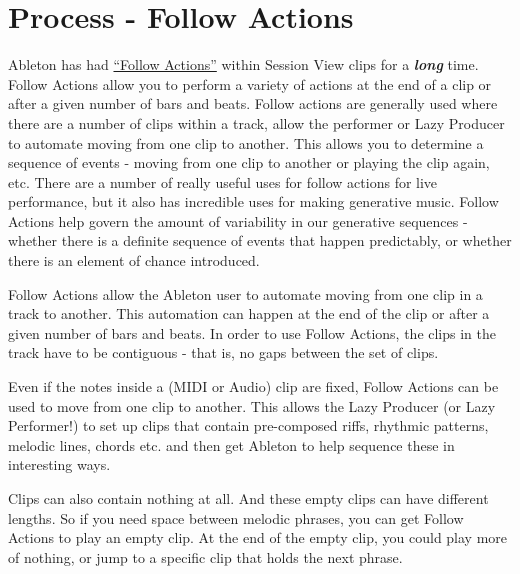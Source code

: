 \documentclass[
  12pt,
  letterpaper,
  oneside,
  open=any]{scrbook}
\begin{document}

\chapter{Process - Follow
Actions}\label{Chapter-003-Process-Follow_Actions}

Ableton has had
\href{https://www.ableton.com/en/live-manual/11/launching-clips/\#follow-actions}{``Follow
Actions''} within Session View clips for a \textbf{\emph{long}} time.
Follow Actions allow you to perform a variety of actions at the end of a
clip or after a given number of bars and beats. Follow actions are
generally used where there are a number of clips within a track, allow
the performer or Lazy Producer to automate moving from one clip to
another. This allows you to determine a sequence of events - moving from
one clip to another or playing the clip again, etc. There are a number
of really useful uses for follow actions for live performance, but it
also has incredible uses for making generative music. Follow Actions
help govern the amount of variability in our generative sequences -
whether there is a definite sequence of events that happen predictably,
or whether there is an element of chance introduced.

\begin{tcolorbox}[enhanced jigsaw, opacitybacktitle=0.6, rightrule=.15mm, leftrule=.75mm, opacityback=0, toptitle=1mm, toprule=.15mm, breakable, titlerule=0mm, colback=white, bottomtitle=1mm, title=\textcolor{quarto-callout-tip-color}{\faLightbulb}\hspace{0.5em}{Key idea}, coltitle=black, left=2mm, colframe=quarto-callout-tip-color-frame, bottomrule=.15mm, colbacktitle=quarto-callout-tip-color!10!white, arc=.35mm]

Follow Actions allow the Ableton user to automate moving from one clip
in a track to another. This automation can happen at the end of the clip
or after a given number of bars and beats. In order to use Follow
Actions, the clips in the track have to be contiguous - that is, no gaps
between the set of clips.

Even if the notes inside a (MIDI or Audio) clip are fixed, Follow
Actions can be used to move from one clip to another. This allows the
Lazy Producer (or Lazy Performer!) to set up clips that contain
pre-composed riffs, rhythmic patterns, melodic lines, chords etc. and
then get Ableton to help sequence these in interesting ways.

Clips can also contain nothing at all. And these empty clips can have
different lengths. So if you need space between melodic phrases, you can
get Follow Actions to play an empty clip. At the end of the empty clip,
you could play more of nothing, or jump to a specific clip that holds
the next phrase.

\end{tcolorbox}
\end{document}
